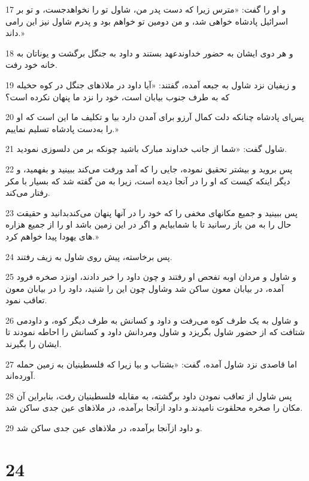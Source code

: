 \par 17 و او را گفت: «مترس زیرا که دست پدر من، شاول تو را نخواهدجست، و تو بر اسرائیل پادشاه خواهی شد، و من دومین تو خواهم بود و پدرم شاول نیز این رامی داند.»
\par 18 و هر دوی ایشان به حضور خداوندعهد بستند و داود به جنگل برگشت و یوناتان به خانه خود رفت.
\par 19 و زیفیان نزد شاول به جبعه آمده، گفتند: «آیا داود در ملاذهای جنگل در کوه حخیله که به طرف جنوب بیابان است، خود را نزد ما پنهان نکرده است؟
\par 20 پس‌ای پادشاه چنانکه دلت کمال آرزو برای آمدن دارد بیا و تکلیف ما این است که او را به‌دست پادشاه تسلیم نماییم.»
\par 21 شاول گفت: «شما از جانب خداوند مبارک باشید چونکه بر من دلسوزی نمودید.
\par 22 پس بروید و بیشتر تحقیق نموده، جایی را که آمد ورفت می‌کند ببینید و بفهمید، و دیگر اینکه کیست که او را در آنجا دیده است، زیرا به من گفته شد که بسیار با مکر رفتار می‌کند.
\par 23 پس ببینید و جمیع مکانهای مخفی را که خود را در آنها پنهان می‌کندبدانید و حقیقت حال را به من باز رسانید تا با شمابیایم و اگر در این زمین باشد او را از جمیع هزاره های یهودا پیدا خواهم کرد.»
\par 24 پس برخاسته، پیش روی شاول به زیف رفتند.
\par 25 و شاول و مردان اوبه تفحص او رفتند و چون داود را خبر دادند، اونزد صخره فرود آمده، در بیابان معون ساکن شد وشاول چون این را شنید، داود را در بیابان معون تعاقب نمود.
\par 26 و شاول به یک طرف کوه می‌رفت و داود و کسانش به طرف دیگر کوه، و داودمی شتافت که از حضور شاول بگریزد و شاول ومردانش داود و کسانش را احاطه نمودند تا ایشان را بگیرند.
\par 27 اما قاصدی نزد شاول آمده، گفت: «بشتاب و بیا زیرا که فلسطینیان به زمین حمله آورده‌اند.
\par 28 پس شاول از تعاقب نمودن داود برگشته، به مقابله فلسطینیان رفت، بنابراین آن مکان را صخره محلقوت نامیدند.و داود ازآنجا برآمده، در ملاذهای عین جدی ساکن شد.
\par 29 و داود ازآنجا برآمده، در ملاذهای عین جدی ساکن شد.
 
\chapter{24}

